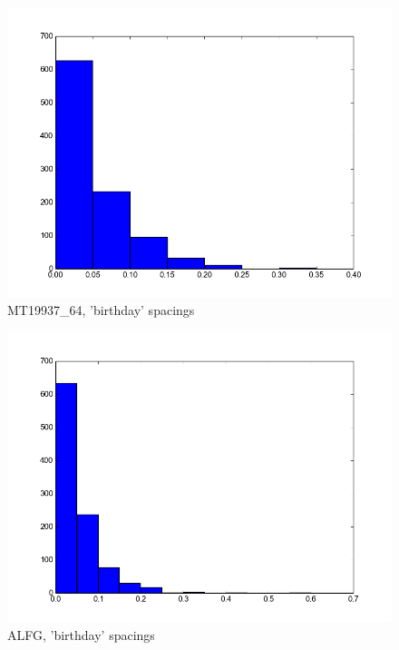 \documentclass[reprint,aip]{revtex4-1}
\begin{document}
\begin{figure}[h]
\includegraphics{bday-mt19937_64.png}
\caption{MT19937\_64, 'birthday' spacings}
\end{figure}

\begin{figure}[h]
\includegraphics{bday-alfg.png}
\caption{ALFG, 'birthday' spacings}
\end{figure}
\end{document}
